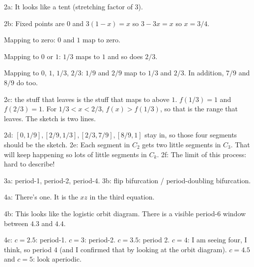 \documentclass[12pt,letterpaper,noanswers]{exam}
\begin{document}
2a: It looks like a tent (stretching factor of 3).

2b: Fixed points are $0$ and $3(1-x) = x$ so $3-3x = x$ so $x = 3/4$.

Mapping to zero: $0$ and $1$ map to zero.

Mapping to $0$ or $1$: $1/3$ maps to $1$ and so does $2/3$.

Mapping to $0$, $1$, $1/3$, $2/3$: $1/9$ and $2/9$ map to $1/3$ and $2/3$.  In addition, $7/9$ and $8/9$ do too.

2c: the stuff that leaves is the stuff that maps to above $1$.  $f(1/3) = 1$ and $f(2/3) = 1$.  For $1/3 < x < 2/3$, $f(x)>f(1/3)$, so that is the range that leaves.  The sketch is two lines.

2d: $[0,1/9], [2/9,1/3], [2/3,7/9], [8/9,1]$ stay in, so those four segments should be the sketch.
2e: Each segment in $C_2$ gets two little segments in $C_3$.  That will keep happening so lots of little segments in $C_k$.
2f: The limit of this process: hard to describe!

3a: period-1, period-2, period-4.
3b: flip bifurcation / period-doubling bifurcation.

4a: There's one.  It is the $xz$ in the third equation.

4b: This looks like the logistic orbit diagram.  There is a visible period-6 window between $4.3$ and $4.4$.

4c: $c=2.5$: period-1.  $c = 3$: period-2.  $c=3.5$: period 2.  $c = 4$: I am seeing four, I think, so period 4 (and I confirmed that by looking at the orbit diagram).  $c= 4.5$ and $c=5$: look aperiodic.
\end{document}
